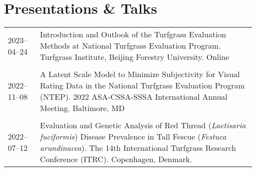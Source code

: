 \documentclass[letterpaper,11pt, english]{article}
\begin{document}
\section{Presentations \& Talks}
\begin{flushleft}
  \begin{tabularx}{\textwidth}{@{}lX@{}}
    2023--04--24 \hspace{1cm} & Introduction and Outlook of the Turfgrass Evaluation Methods at National Turfgrass Evaluation Program. Turfgrass Institute, Beijing Forestry University. Online \\
    \\[-0.2cm] 
    2022--11--08 \hspace{1cm} & A Latent Scale Model to Minimize Subjectivity for Visual Rating Data in the National Turfgrass Evaluation Program (NTEP). 2022 ASA-CSSA-SSSA International Annual Meeting. Baltimore, MD \\
    \\[-0.2cm] 
    2022--07--12 \hspace{1cm} & Evaluation and Genetic Analysis of Red Thread (\textit{Laetisaria fuciformis}) Disease Prevalence in Tall Fescue (\textit{Festuca arundinacea}). The 14th International Turfgrass Research Conference (ITRC). Copenhagen, Denmark. \\
  \end{tabularx}
\end{flushleft}
\end{document}
